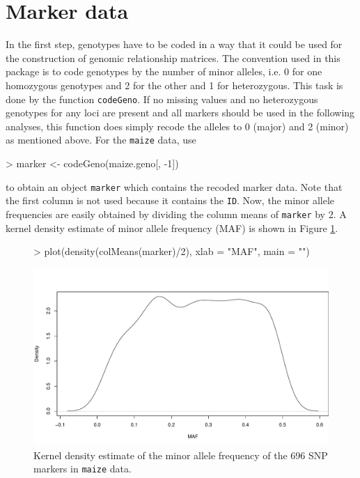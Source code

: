 \documentclass[a4paper,11pt]{article}
\begin{document}
\section{Marker data}\label{sec:MarkerData}

In the first step, genotypes have to be coded in a way that it could be used for the construction of genomic relationship matrices. The convention used in this package is to code genotypes by the number of minor alleles, i.e. 0 for one homozygous genotypes and 2 for the other and 1 for heterozygous.
This task is done by the function \texttt{codeGeno}. If no missing values and no heterozygous genotypes for any loci are present 
and all markers should be used in the following analyses, this function does simply recode the alleles to 0 (major) and 2 (minor) as mentioned above.
For the \texttt{maize} data, use
\begin{Schunk}
\begin{Sinput}
> marker <- codeGeno(maize.geno[, -1])
\end{Sinput}
\end{Schunk}
to obtain an object \texttt{marker} which contains the recoded marker data. 
Note that the first column is not used because it contains the \texttt{ID}. 
Now, the minor allele frequencies are easily obtained by dividing the column means of \texttt{marker} by 2. 
A kernel density estimate of minor allele frequency (MAF) is shown in Figure \ref{fig:histmaf}.

\begin{figure}[h]
\centering
\begin{Schunk}
\begin{Sinput}
> plot(density(colMeans(marker)/2), xlab = "MAF", main = "")
\end{Sinput}
\end{Schunk}
\includegraphics{figs/vignette-004}
\caption{Kernel density estimate of the minor allele frequency of the 696 SNP markers in \texttt{maize} data.}
\label{fig:histmaf}
\end{figure}
\end{document}
